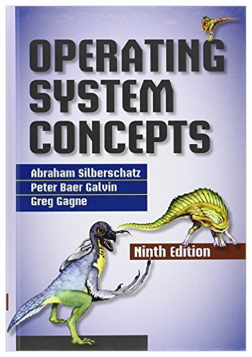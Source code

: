 \documentclass[dvipsnames,14pt,t]{beamer}
\begin{document}
\begin{frame}[c]
\begin{textblock}{11}
         {\includegraphics[scale=0.125]{pics/p4.jpg}}

\end{textblock}
\end{frame}
\end{document}
